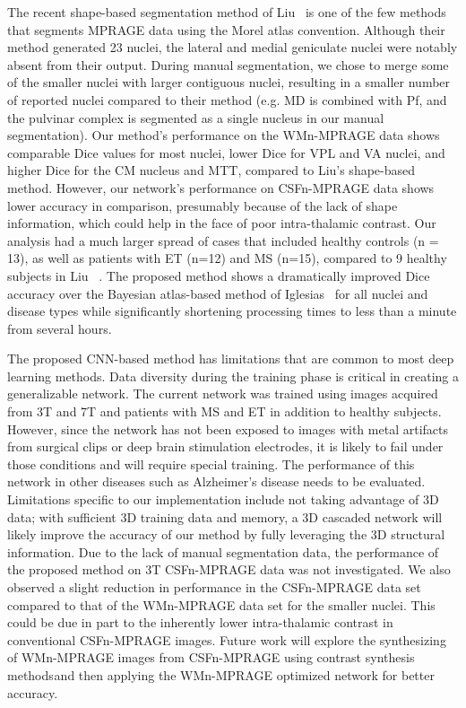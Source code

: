 The recent shape-based segmentation method of Liu\unskip~\cite{1643371:26789966} is one of the few methods that segments MPRAGE data using the Morel atlas convention. Although their method generated 23 nuclei, the lateral and medial geniculate nuclei were notably absent from their output. During manual segmentation, we chose to merge some of the smaller nuclei with larger contiguous nuclei, resulting in a smaller number of reported nuclei compared to their method (e.g. MD is combined with Pf, and the pulvinar complex is segmented as a single nucleus in our manual segmentation). Our method's performance on the WMn-MPRAGE data shows comparable Dice values for most nuclei, lower Dice for VPL and VA nuclei, and higher Dice for the CM nucleus and MTT, compared to Liu's shape-based method. However, our network's performance on CSFn-MPRAGE data shows lower accuracy in comparison, presumably because of the lack of shape information, which could help in the face of poor intra-thalamic contrast. Our analysis had a much larger spread of cases that included healthy controls (n = 13), as well as patients with ET (n=12) and MS (n=15), compared to 9 healthy subjects in Liu\unskip~\cite{1643371:26789966} . The proposed method shows a dramatically improved Dice accuracy over the Bayesian atlas-based method of Iglesias\unskip~\cite{1643371:26789917} for all nuclei and disease types while significantly shortening processing times to less than a minute from several hours.

The proposed CNN-based method has limitations that are common to most deep learning methods. Data diversity during the training phase is critical in creating a generalizable network. The current network was trained using images acquired from 3T and 7T and patients with MS and ET in addition to healthy subjects. However, since the network has not been exposed to images with metal artifacts from surgical clips or deep brain stimulation electrodes, it is likely to fail under those conditions and will require special training. The performance of this network in other diseases such as Alzheimer's disease needs to be evaluated. Limitations specific to our implementation include not taking advantage of 3D data; with sufficient 3D training data and memory, a 3D cascaded network will likely improve the accuracy of our method by fully leveraging the 3D structural information. Due to the lack of manual segmentation data, the performance of the proposed method on 3T CSFn-MPRAGE data was not investigated. We also observed a slight reduction in performance in the CSFn-MPRAGE data set compared to that of the WMn-MPRAGE data set for the smaller nuclei. This could be due in part to the inherently lower intra-thalamic contrast in conventional CSFn-MPRAGE images. Future work will explore the synthesizing of WMn-MPRAGE images from CSFn-MPRAGE using contrast synthesis methods\ensuremath{^{}}and then applying the WMn-MPRAGE optimized network for better accuracy. 
    
